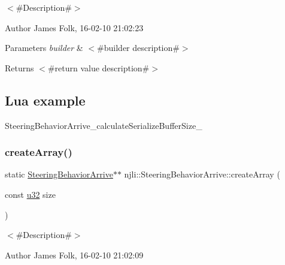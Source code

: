 $<$\#\+Description\#$>$ 

\begin{DoxyAuthor}{Author}
James Folk, 16-\/02-\/10 21\+:02\+:23
\end{DoxyAuthor}

\begin{DoxyParams}{Parameters}
{\em builder} & $<$\#builder description\#$>$\\
\hline
\end{DoxyParams}
\begin{DoxyReturn}{Returns}
$<$\#return value description\#$>$
\end{DoxyReturn}
\hypertarget{classnjli_1_1_steering_behavior_wander_ex1}{}\subsection{Lua example}\label{classnjli_1_1_steering_behavior_wander_ex1}

\begin{DoxyCodeInclude}
\end{DoxyCodeInclude}
Steering\+Behavior\+Arrive\+\_\+calculate\+Serialize\+Buffer\+Size\+\_\+ \mbox{\label{classnjli_1_1_steering_behavior_arrive_a2c5ab81118b43b5cd6c5b1f0c0820730}} 
\subsubsection{\texorpdfstring{create\+Array()}{createArray()}}
{\footnotesize\ttfamily static \mbox{\hyperlink{classnjli_1_1_steering_behavior_arrive}{Steering\+Behavior\+Arrive}}$\ast$$\ast$ njli\+::\+Steering\+Behavior\+Arrive\+::create\+Array (\begin{DoxyParamCaption}\item[{const \mbox{\hyperlink{_util_8h_a10e94b422ef0c20dcdec20d31a1f5049}{u32}}}]{size }\end{DoxyParamCaption})\hspace{0.3cm}{\ttfamily [static]}}



$<$\#\+Description\#$>$ 

\begin{DoxyAuthor}{Author}
James Folk, 16-\/02-\/10 21\+:02\+:09
\end{DoxyAuthor}

